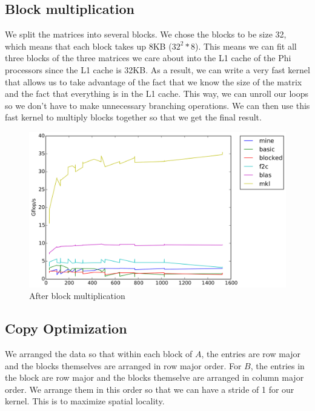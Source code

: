 \documentclass[11pt]{article}
\begin{document}
        \subsection{Block multiplication}
        We split the matrices into several blocks. We chose the blocks to be size 32, which means that each block takes up 8KB ($32^2 * 8$). This means we can fit all three blocks of the three matrices we care about into the L1 cache of the Phi processors since the L1 cache is 32KB. As a result, we can write a very fast kernel that allows us to take advantage of the fact that we know the size of the matrix and the fact that everything is in the L1 cache. This way, we can unroll our loops so we don't have to make unnecessary branching operations. We can then use this fast kernel to multiply blocks together so that we get the final result.
        
        \begin{figure}[H]
            \centering
            \includegraphics[width=4.5in]{timing_32.png}
            \caption{After block multiplication}
        \end{figure}
        
        \clearpage
        
    
        
        \subsection{Copy Optimization}
        We arranged the data so that within each block of $A$, the entries are row major and the blocks themselves are arranged in row major order. For $B$, the entries in the block are row major and the blocks themselve are arranged in column major order. We arrange them in this order so that we can have a stride of 1 for our kernel. This is to maximize spatial locality.
        
\end{document}
